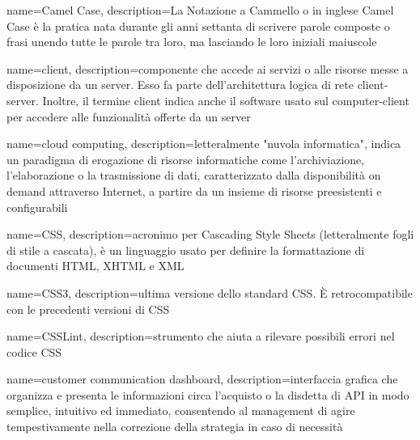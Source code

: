 \hypertarget{C}{}

{
	name=Camel Case,
	description={La Notazione a Cammello o in inglese Camel Case è la pratica nata durante gli anni settanta di scrivere parole composte o frasi unendo tutte le parole tra loro, ma lasciando le loro iniziali maiuscole}
}

{
	name=client,
	description={componente che accede ai servizi o alle risorse messe a disposizione da un server. Esso fa parte dell'architettura logica di rete client-server. Inoltre, il termine client indica anche il software usato sul computer-client per accedere alle funzionalità offerte da un server}
}

{
	name=cloud computing,
	description={letteralmente "nuvola informatica", indica un paradigma di erogazione di risorse informatiche come l'archiviazione, l'elaborazione o la trasmissione di dati, caratterizzato dalla disponibilità on demand attraverso Internet, a partire da un insieme di risorse preesistenti e configurabili}
}

{
	name=CSS,
	description={acronimo per Cascading Style Sheets (letteralmente fogli di stile a cascata), è un linguaggio usato per definire la formattazione di documenti HTML, XHTML e XML}
}

{
	name=CSS3,
	description={ultima versione dello standard CSS. \MakeUppercase{è} retrocompatibile con le precedenti versioni di CSS}
}

{
	name=CSSLint,
	description={strumento che aiuta a rilevare possibili errori nel codice CSS}
}

{
	name=customer communication dashboard,
	description={interfaccia grafica che organizza e presenta le informazioni circa l'acquisto o la disdetta di API in modo semplice, intuitivo ed immediato, consentendo al management di agire tempestivamente nella correzione della strategia in caso di necessità}
}



	
